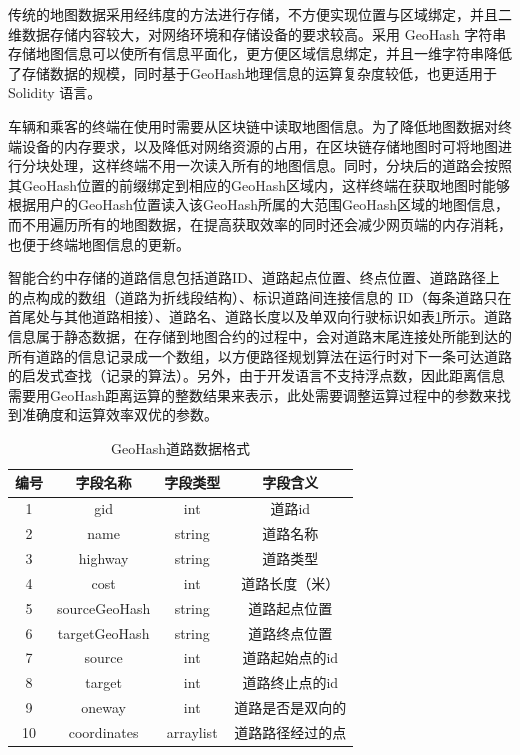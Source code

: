 传统的地图数据采用经纬度的方法进行存储，不方便实现位置与区域绑定，并且二维数据存储内容较大，对网络环境和存储设备的要求较高。采用 GeoHash 字符串存储地图信息可以使所有信息平面化，更方便区域信息绑定，并且一维字符串降低了存储数据的规模，同时基于GeoHash地理信息的运算复杂度较低，也更适用于 Solidity 语言。

车辆和乘客的终端在使用时需要从区块链中读取地图信息。为了降低地图数据对终端设备的内存要求，以及降低对网络资源的占用，在区块链存储地图时可将地图进行分块处理，这样终端不用一次读入所有的地图信息。同时，分块后的道路会按照其GeoHash位置的前缀绑定到相应的GeoHash区域内，这样终端在获取地图时能够根据用户的GeoHash位置读入该GeoHash所属的大范围GeoHash区域的地图信息，而不用遍历所有的地图数据，在提高获取效率的同时还会减少网页端的内存消耗，也便于终端地图信息的更新。

智能合约中存储的道路信息包括道路ID、道路起点位置、终点位置、道路路径上的点构成的数组（道路为折线段结构）、标识道路间连接信息的 ID（每条道路只在首尾处与其他道路相接）、道路名、道路长度以及单双向行驶标识如表\ref{tab:roadFormat}所示。道路信息属于静态数据，在存储到地图合约的过程中，会对道路末尾连接处所能到达的所有道路的信息记录成一个数组，以方便路径规划算法在运行时对下一条可达道路的启发式查找（记录的算法）。另外，由于开发语言不支持浮点数，因此距离信息需要用GeoHash距离运算的整数结果来表示，此处需要调整运算过程中的参数来找到准确度和运算效率双优的参数。

\begin{table}
  \centering
  \caption{GeoHash道路数据格式}\label{tab:roadFormat}
  \begin{tabular*}{0.9\textwidth}{@{\extracolsep{\fill}}cccc}
  \toprule
    编号    &字段名称 &字段类型 &字段含义 \\
  \midrule
    1    &gid &int &道路id\\
    2    &name &string &道路名称\\
    3    &highway &string &道路类型\\
    4    &cost &int &道路长度（米）\\
    5    &sourceGeoHash &string &道路起点位置\\
    6    &targetGeoHash &string &道路终点位置\\
    7    &source &int &道路起始点的id\\
    8    &target &int &道路终止点的id\\
    9    &oneway &int &道路是否是双向的\\
    10    &coordinates &arraylist &道路路径经过的点\\
  \bottomrule
  \end{tabular*}
\end{table}

